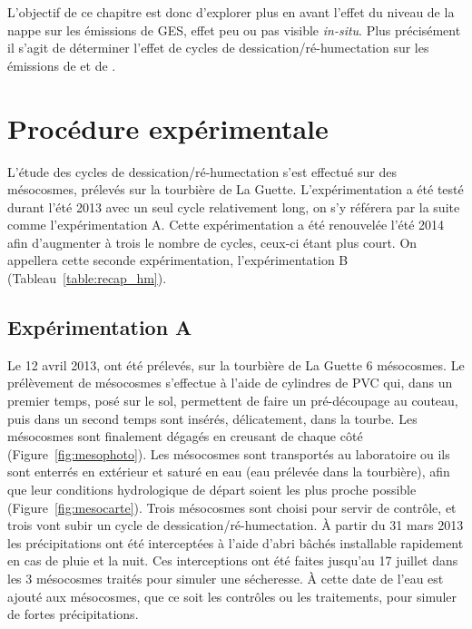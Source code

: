 L'objectif de ce chapitre est donc d'explorer plus en avant l'effet du niveau de la nappe sur les émissions de GES, effet peu ou pas visible \textit{in-situ}.
Plus précisément il s'agit de déterminer l'effet de cycles de dessication/ré-humectation sur les émissions de \coo et de \chh. 

\section{Procédure expérimentale}

L'étude des cycles de dessication/ré-humectation s'est effectué sur des mésocosmes, prélevés sur la tourbière de La Guette.
L'expérimentation a été testé durant l'été 2013 avec un seul cycle relativement long, on s'y référera par la suite comme l'expérimentation A.
Cette expérimentation a été renouvelée l'été 2014 afin d'augmenter à trois le nombre de cycles, ceux-ci étant plus court.
On appellera cette seconde expérimentation, l'expérimentation B (Tableau~\ref{table:recap_hm}).

\subsection{Expérimentation A}
Le 12 avril 2013, ont été prélevés, sur la tourbière de La Guette 6 mésocosmes.
Le prélèvement de mésocosmes s'effectue à l'aide de cylindres de PVC qui, dans un premier temps, posé sur le sol, permettent de faire un pré-découpage au couteau, puis dans un second temps sont insérés, délicatement, dans la tourbe. 
Les mésocosmes sont finalement dégagés en creusant de chaque côté (Figure~\ref{fig:mesophoto}).
Les mésocosmes sont transportés au laboratoire ou ils sont enterrés en extérieur et saturé en eau (eau prélevée dans la tourbière), afin que leur conditions hydrologique de départ soient les plus proche possible (Figure~\ref{fig:mesocarte}).
Trois mésocosmes sont choisi pour servir de contrôle, et trois vont subir un cycle de dessication/ré-humectation.
À partir du 31 mars 2013 les précipitations ont été interceptées à l'aide d'abri bâchés installable rapidement en cas de pluie et la nuit.
Ces interceptions ont été faites jusqu'au 17 juillet dans les 3 mésocosmes traités pour simuler une sécheresse.
À cette date de l'eau est ajouté aux mésocosmes, que ce soit les contrôles ou les traitements, pour simuler de fortes précipitations.

